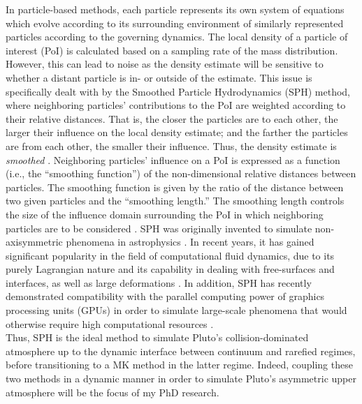 \documentclass[times,12]{article}
\begin{document}
\indent In particle-based methods, each particle represents its own system of equations which evolve according to its surrounding environment of similarly represented particles according to the governing dynamics. The local density of a particle of interest (PoI) is calculated based on a sampling rate of the mass distribution. However, this can lead to noise as the density estimate will be sensitive to whether a distant particle is in- or outside of the estimate. This issue is specifically dealt with by the Smoothed Particle Hydrodynamics (SPH) method, where neighboring particles' contributions to the PoI are weighted according to their relative distances. That is, the closer the particles are to each other, the larger their influence on the local density estimate; and the farther the particles are from each other, the smaller their influence. Thus, the density estimate is \textit{smoothed} \citep{Price2012}. Neighboring particles' influence on a PoI is expressed as a function (i.e., the ``smoothing function'') of the non-dimensional relative distances between particles. The smoothing function is given by the ratio of the distance between two given particles and the ``smoothing length.'' The smoothing length controls the size of the influence domain surrounding the PoI in which neighboring particles are to be considered \citep{liu2003}. SPH was originally invented to simulate non-axisymmetric phenomena in astrophysics \citep{gingold1977, lucy1977}. In recent years, it has gained significant popularity in the field of computational fluid dynamics, due to its purely Lagrangian nature and its capability in dealing with free-surfaces and interfaces, as well as large deformations \citep{monaghan1994, monaghan2005, ni2016}. In addition, SPH has recently demonstrated compatibility with the parallel computing power of graphics processing units (GPUs) in order to simulate large-scale phenomena that would otherwise require high computational resources \citep{dominguez2013, crespo2015}. \\
\indent Thus, SPH is the ideal method to simulate Pluto's collision-dominated atmosphere up to the dynamic interface between continuum and rarefied regimes, before transitioning to a MK method in the latter regime. Indeed, coupling these two methods in a dynamic manner in order to simulate Pluto's asymmetric upper atmosphere will be the focus of my PhD research.
\end{document}
